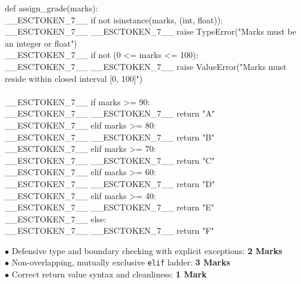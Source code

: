 \begin{solutionbox}
\begin{pycode}
def assign\_grade(marks):\\
\_\_ESCTOKEN\_7\_\_ if not isinstance(marks, (int, float)):\\
\_\_ESCTOKEN\_7\_\_ \_\_ESCTOKEN\_7\_\_ raise TypeError("Marks must be an integer or float")\\
\_\_ESCTOKEN\_7\_\_ if not (0 <= marks <= 100):\\
\_\_ESCTOKEN\_7\_\_ \_\_ESCTOKEN\_7\_\_ raise ValueError("Marks must reside within closed interval [0, 100]")\\
~\\
\_\_ESCTOKEN\_7\_\_ if marks >= 90:\\
\_\_ESCTOKEN\_7\_\_ \_\_ESCTOKEN\_7\_\_ return "A"\\
\_\_ESCTOKEN\_7\_\_ elif marks >= 80:\\
\_\_ESCTOKEN\_7\_\_ \_\_ESCTOKEN\_7\_\_ return "B"\\
\_\_ESCTOKEN\_7\_\_ elif marks >= 70:\\
\_\_ESCTOKEN\_7\_\_ \_\_ESCTOKEN\_7\_\_ return "C"\\
\_\_ESCTOKEN\_7\_\_ elif marks >= 60:\\
\_\_ESCTOKEN\_7\_\_ \_\_ESCTOKEN\_7\_\_ return "D"\\
\_\_ESCTOKEN\_7\_\_ elif marks >= 40:\\
\_\_ESCTOKEN\_7\_\_ \_\_ESCTOKEN\_7\_\_ return "E"\\
\_\_ESCTOKEN\_7\_\_ else:\\
\_\_ESCTOKEN\_7\_\_ \_\_ESCTOKEN\_7\_\_ return "F"
\end{pycode}
\begin{markingrubric}
$\bullet$ Defensive type and boundary checking with explicit exceptions: \textbf{2 Marks}\\
$\bullet$ Non-overlapping, mutually exclusive \texttt{elif} ladder: \textbf{3 Marks}\\
$\bullet$ Correct return value syntax and cleanliness: \textbf{1 Mark}
\end{markingrubric}
\end{solutionbox}

